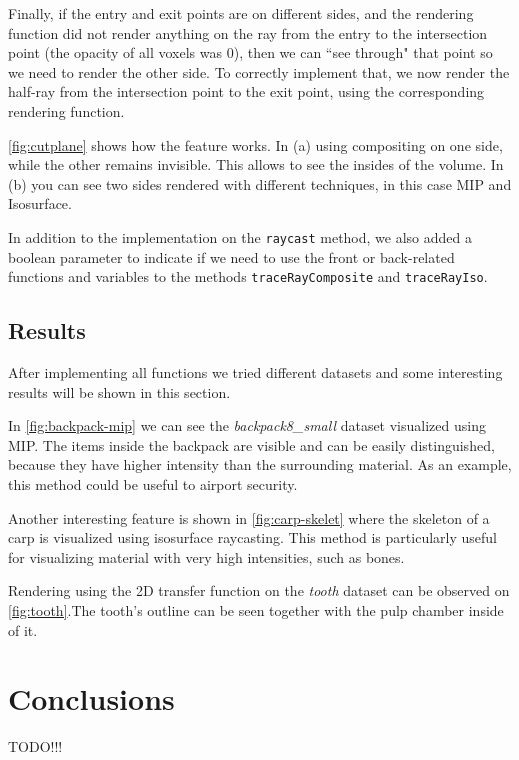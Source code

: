 \documentclass[a4paper]{article}
\begin{document}
Finally, if the entry and exit points are on different sides, and the rendering function did not render anything on the ray from the entry to the intersection point (the opacity of all voxels was $0$), then we can ``see through" that point so we need to render the other side. To correctly implement that, we now render the half-ray from the intersection point to the exit point, using the corresponding rendering function.

\autoref{fig:cutplane} shows how the feature works. In (a) using compositing on one side, while the other remains invisible. This allows to see the insides of the volume. In (b) you can see two sides rendered with different techniques, in this case MIP and Isosurface.

In addition to the implementation on the {\tt raycast} method, we also added a boolean parameter to indicate if we need to use the front or back-related functions and variables to the methods {\tt traceRayComposite} and {\tt traceRayIso}.

\subsection{Results}

After implementing all functions we tried different datasets and some interesting results will be shown in this section.

In \autoref{fig:backpack-mip} we can see the \textit{backpack8\_small} dataset visualized using MIP. The items inside the backpack are visible and can be easily distinguished, because they have higher intensity than the surrounding material. As an example, this method could be useful to airport security.

Another interesting feature is shown in \autoref{fig:carp-skelet} where the skeleton of a carp is visualized using isosurface raycasting. This method is particularly useful for visualizing material with very high intensities, such as bones.

Rendering using the 2D transfer function on the \textit{tooth} dataset   can be observed on \autoref{fig:tooth}.The tooth's outline can be seen together with the pulp chamber inside of it.

\section{Conclusions}

TODO!!!



\end{document}

